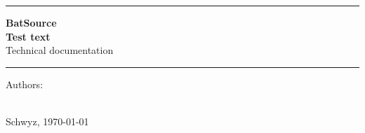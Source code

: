 \begin{titlepage}

    \vspace{4mm}

    \begin{center}
    \end{center} 


    \begin{center}
        \rule{\textwidth}{2pt}
    \end{center}

    \vspace{2mm}

    \begin{center}
      \huge{\textbf{BatSource}}\\
      \LARGE{\textbf{Test text}}\\
        \vspace{4mm}
        \Large{Technical documentation}
    \end{center}
    

    \begin{center}
        \rule{\textwidth}{2pt}
    \end{center}

    \vspace{4mm}

    \begin{center}
        Authors:\\
        \large{\makeatletter \@author \makeatother}\\
        \vspace{4mm}
    \end{center}

    \vspace{3mm}

    \begin{center}
        Schwyz, \today
    \end{center}

\end{titlepage}
\clearpage
